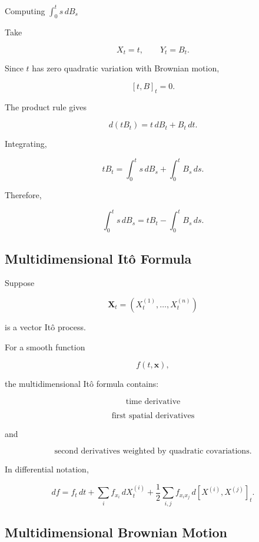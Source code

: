 \begin{workedexamplebox}{Computing \(\int_0^t s\,dB_s\)}

Take

\[
X_t=t,
\qquad
Y_t=B_t.
\]

Since \(t\) has zero quadratic variation with Brownian motion,

\[
[t,B]_t=0.
\]

The product rule gives

\[
d(tB_t)
=
t\,dB_t
+
B_t\,dt.
\]

Integrating,

\[
tB_t
=
\int_0^t
s\,dB_s
+
\int_0^t
B_s\,ds.
\]

Therefore,

\begin{answerbox}
\[
\boxed{
\int_0^t
s\,dB_s
=
tB_t
-
\int_0^t
B_s\,ds.
}
\]
\end{answerbox}

\end{workedexamplebox}

\subsection{Multidimensional It\^o Formula}
\label{subsec:multidimensional-ito}

Suppose

\[
\mathbf{X}_t
=
(X_t^{(1)},\ldots,X_t^{(n)})
\]

is a vector It\^o process.

For a smooth function

\[
f(t,\mathbf{x}),
\]

the multidimensional It\^o formula contains:

\[
\boxed{
\text{time derivative}
}
\]

\[
\boxed{
\text{first spatial derivatives}
}
\]

and

\[
\boxed{
\text{second derivatives weighted by quadratic covariations}.
}
\]

In differential notation,

\[
\boxed{
df
=
f_t\,dt
+
\sum_i
f_{x_i}\,dX_t^{(i)}
+
\frac12
\sum_{i,j}
f_{x_ix_j}
\,d[X^{(i)},X^{(j)}]_t.
}
\]

\subsection{Multidimensional Brownian Motion}
\label{subsec:multidimensional-brownian}

